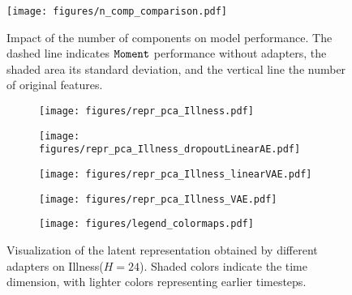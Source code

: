 \begin{figure}[ht]
\centering
\texttt{[image: figures/n\_comp\_comparison.pdf]}
\caption{Impact of the number of components on model performance. The dashed line indicates $\texttt{Moment}$ performance without adapters, the shaded area its standard deviation, and the vertical line the number of original features.}
\label{fig:dimred}
\end{figure}

\begin{figure*}[t]
\centering
\begin{subfigure}[b]{0.24\textwidth}
         \centering
 \texttt{[image: figures/repr\_pca\_Illness.pdf]}
 \label{fig:subfig_pca}
\end{subfigure}
\hfill
\begin{subfigure}[b]{0.24\textwidth}
 \centering
 \texttt{[image: figures/repr\_pca\_Illness\_dropoutLinearAE.pdf]}
 \label{fig:subfig_dropout}
\end{subfigure}
\hfill
\begin{subfigure}[b]{0.24\textwidth}
 \centering
 \texttt{[image: figures/repr\_pca\_Illness\_linearVAE.pdf]}
 \label{fig:subfig_linearvae}
\end{subfigure}
\hfill
\begin{subfigure}[b]{0.24\textwidth}
 \centering
 \texttt{[image: figures/repr\_pca\_Illness\_VAE.pdf]}
 \label{fig:subfig_vae}
\end{subfigure}
\vfill
\vskip -0.1in
\begin{subfigure}[b]{0.5\textwidth}
 \centering
 \texttt{[image: figures/legend\_colormaps.pdf]}
\end{subfigure}
\caption{Visualization of the latent representation obtained by different adapters  on Illness($H=24$). Shaded colors indicate the time dimension, with lighter colors representing earlier timesteps.}
\label{fig:latent}
\end{figure*}

